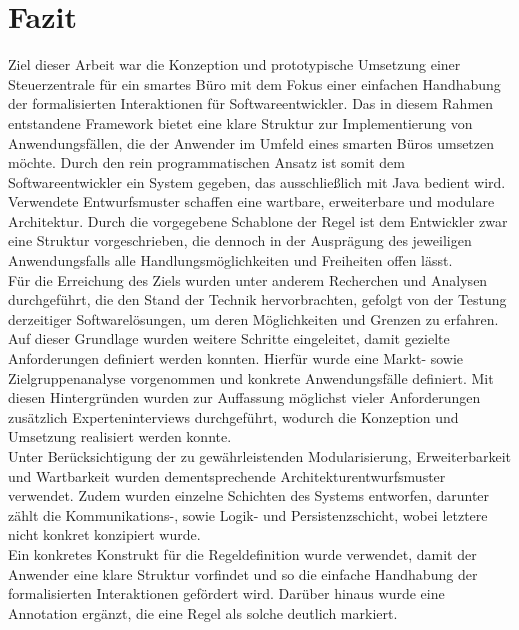 \chapter{Fazit}
\label{chap:fazit}
    Ziel dieser Arbeit war die Konzeption und prototypische Umsetzung einer Steuerzentrale für ein 
    smartes Büro mit dem Fokus einer einfachen Handhabung der formalisierten Interaktionen für Softwareentwickler. 
    Das in diesem Rahmen entstandene Framework bietet eine klare Struktur zur Implementierung von Anwendungsfällen, die der Anwender 
    im Umfeld eines smarten Büros umsetzen möchte. Durch den rein programmatischen Ansatz ist somit 
    dem Softwareentwickler ein System gegeben, das ausschließlich mit Java bedient wird. Verwendete 
    Entwurfsmuster schaffen eine wartbare, erweiterbare und modulare Architektur. Durch die vorgegebene Schablone der 
    Regel ist dem Entwickler zwar eine Struktur vorgeschrieben, die dennoch in der 
    Ausprägung des jeweiligen Anwendungsfalls alle Handlungsmöglichkeiten und Freiheiten offen lässt. 
    \\
    \linebreak 
    Für die Erreichung des Ziels wurden unter anderem Recherchen und Analysen durchgeführt, die den Stand 
    der Technik hervorbrachten, gefolgt von der Testung derzeitiger Softwarelösungen, um deren Möglichkeiten und Grenzen zu erfahren. 
    Auf dieser Grundlage wurden weitere Schritte eingeleitet, damit gezielte Anforderungen definiert werden konnten. Hierfür wurde 
    eine Markt- sowie Zielgruppenanalyse vorgenommen und konkrete Anwendungsfälle definiert. Mit diesen Hintergründen wurden zur 
    Auffassung möglichst vieler Anforderungen zusätzlich Experteninterviews durchgeführt, wodurch die Konzeption und Umsetzung 
    realisiert werden konnte. 
    \\
    \linebreak
    Unter Berücksichtigung der zu gewährleistenden Modularisierung, Erweiterbarkeit und Wartbarkeit wurden dementsprechende 
    Architekturentwurfsmuster verwendet. Zudem wurden einzelne Schichten des Systems entworfen, darunter zählt die Kommunikations-, sowie 
    Logik- und Persistenzschicht, wobei letztere nicht konkret konzipiert wurde.     
    \\
    Ein konkretes Konstrukt für die Regeldefinition wurde verwendet, damit der Anwender eine klare Struktur vorfindet und so die 
    einfache Handhabung der formalisierten Interaktionen gefördert wird. Darüber hinaus wurde eine Annotation ergänzt, die eine Regel als solche 
    deutlich markiert.
